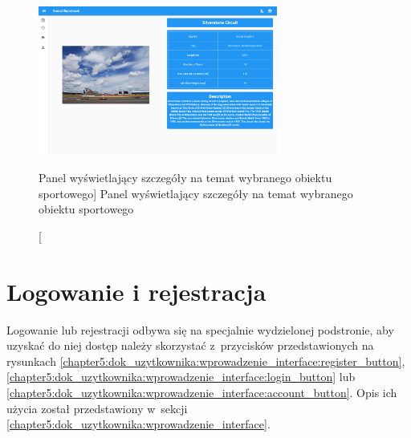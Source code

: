 \documentclass[../Kamil_Kowalewski_Main.tex]{subfiles}
\begin{document}
{{        \begin{figure}[H]
            \centering
            \includegraphics[width=0.7\textwidth, keepaspectratio]
            {img/chapter5/notloggedin/racetrack_details.png}
            \caption
            [Panel wyświetlający szczegóły na temat wybranego obiektu sportowego]
            {Panel wyświetlający szczegóły na temat wybranego obiektu sportowego}
            \label{chapter5:dok_uzytkownika:obsluga_niezalogowany:racetrack_details}
        \end{figure}
    }

    \section{Logowanie i rejestracja}
    \label{chapter5:dok_uzytkownika:logowanie_rejestracja} {
        Logowanie lub rejestracji odbywa się na specjalnie wydzielonej podstronie, aby
        uzyskać do niej dostęp należy skorzystać z~przycisków przedstawionych na
        rysunkach \ref{chapter5:dok_uzytkownika:wprowadzenie_interface:register_button},
        \ref{chapter5:dok_uzytkownika:wprowadzenie_interface:login_button} lub
        \ref{chapter5:dok_uzytkownika:wprowadzenie_interface:account_button}. Opis ich
        użycia został przedstawiony w~sekcji
        \ref{chapter5:dok_uzytkownika:wprowadzenie_interface}.

}}
\end{document}
